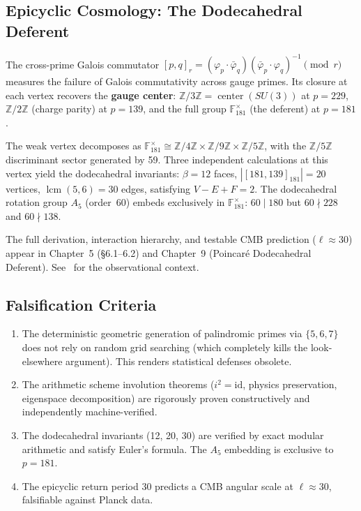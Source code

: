 \subsection{Epicyclic Cosmology: The Dodecahedral Deferent}

The cross-prime Galois commutator $[p,q]_r = (\varphi_p \cdot \bar{\varphi}_q)(\bar{\varphi}_p \cdot \varphi_q)^{-1} \pmod{r}$ measures the failure of Galois commutativity across gauge primes. Its closure at each vertex recovers the \textbf{gauge center}: $\mathbb{Z}/3\mathbb{Z} = \operatorname{center}(SU(3))$ at $p=229$, $\mathbb{Z}/2\mathbb{Z}$ (charge parity) at $p=139$, and the full group $\mathbb{F}_{181}^{\times}$ (the deferent) at $p=181$.

The weak vertex decomposes as $\mathbb{F}_{181}^{\times} \cong \mathbb{Z}/4\mathbb{Z} \times \mathbb{Z}/9\mathbb{Z} \times \mathbb{Z}/5\mathbb{Z}$, with the $\mathbb{Z}/5\mathbb{Z}$ discriminant sector generated by 59. Three independent calculations at this vertex yield the dodecahedral invariants: $\beta = 12$ faces, $|[181,139]_{181}| = 20$ vertices, $\operatorname{lcm}(5,6) = 30$ edges, satisfying $V - E + F = 2$. The dodecahedral rotation group $A_5$ (order~60) embeds exclusively in $\mathbb{F}_{181}^{\times}$: $60 \mid 180$ but $60 \nmid 228$ and $60 \nmid 138$.

The full derivation, interaction hierarchy, and testable CMB prediction ($\ell \approx 30$) appear in Chapter~5 (\S6.1--6.2) and Chapter~9 (Poincar\'{e} Dodecahedral Deferent). See~\cite{luminet2003, planck2020} for the observational context.

\subsection{Falsification Criteria}
\begin{enumerate}
    \item The deterministic geometric generation of palindromic primes via $\{5, 6, 7\}$ does not rely on random grid searching (which completely kills the look-elsewhere argument). This renders statistical defenses obsolete.
    \item The arithmetic scheme involution theorems ($i^2 = \mathrm{id}$, physics preservation, eigenspace decomposition) are rigorously proven constructively and independently machine-verified.
    \item The dodecahedral invariants (12, 20, 30) are verified by exact modular arithmetic and satisfy Euler's formula.  The $A_5$ embedding is exclusive to $p = 181$.
    \item The epicyclic return period 30 predicts a CMB angular scale at $\ell \approx 30$, falsifiable against Planck data.
\end{enumerate}

